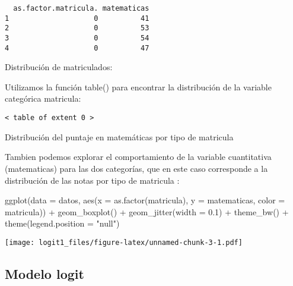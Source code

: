 \documentclass[
]{article}
\newenvironment{Shaded}{\begin{snugshade}}{\end{snugshade}}
\newcommand{\AttributeTok}[1]{\textcolor[rgb]{0.77,0.63,0.00}{#1}}
\newcommand{\FloatTok}[1]{\textcolor[rgb]{0.00,0.00,0.81}{#1}}
\newcommand{\FunctionTok}[1]{\textcolor[rgb]{0.00,0.00,0.00}{#1}}
\newcommand{\NormalTok}[1]{#1}
\newcommand{\SpecialCharTok}[1]{\textcolor[rgb]{0.00,0.00,0.00}{#1}}
\newcommand{\StringTok}[1]{\textcolor[rgb]{0.31,0.60,0.02}{#1}}
\begin{document}
\begin{verbatim}
  as.factor.matricula. matematicas
1                    0          41
2                    0          53
3                    0          54
4                    0          47
\end{verbatim}

Distribución de matriculados:

Utilizamos la función table() para encontrar la distribución de la
variable categórica matricula:

\begin{Shaded}
\end{Shaded}

\begin{verbatim}
< table of extent 0 >
\end{verbatim}

Distribución del puntaje en matemáticas por tipo de matricula

Tambien podemos explorar el comportamiento de la variable cuantitativa
(matematicas) para las dos categorías, que en este caso corresponde a la
distribución de las notas por tipo de matricula :

\begin{Shaded}
\begin{Highlighting}[]
\FunctionTok{ggplot}\NormalTok{(}\AttributeTok{data =}\NormalTok{ datos, }\FunctionTok{aes}\NormalTok{(}\AttributeTok{x =} \FunctionTok{as.factor}\NormalTok{(matricula), }\AttributeTok{y =}\NormalTok{ matematicas, }\AttributeTok{color =}\NormalTok{ matricula)) }\SpecialCharTok{+}
  \FunctionTok{geom\_boxplot}\NormalTok{() }\SpecialCharTok{+}
  \FunctionTok{geom\_jitter}\NormalTok{(}\AttributeTok{width =} \FloatTok{0.1}\NormalTok{) }\SpecialCharTok{+}
  \FunctionTok{theme\_bw}\NormalTok{() }\SpecialCharTok{+}
  \FunctionTok{theme}\NormalTok{(}\AttributeTok{legend.position =} \StringTok{"null"}\NormalTok{)}
\end{Highlighting}
\end{Shaded}

\texttt{[image: logit1\_files/figure-latex/unnamed-chunk-3-1.pdf]}

\hypertarget{modelo-logit}{%
\subsection{Modelo logit}\label{modelo-logit}}
\end{document}

